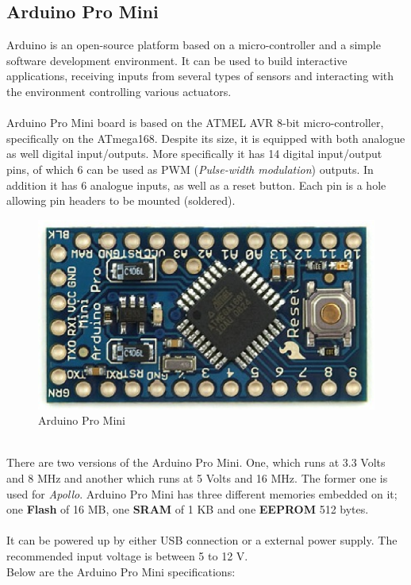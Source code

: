 \documentclass[12pt,a4paper]{report}
\begin{document}
\subsection{Arduino Pro Mini}
Arduino is an open-source platform based on a micro-controller and a simple software development environment. It can be used to build interactive applications, receiving inputs from several types of sensors and interacting with the environment controlling various actuators.\\
\ \\
Arduino Pro Mini board is based on the ATMEL AVR 8-bit micro-controller, specifically on the ATmega168. Despite its size, it is equipped with both analogue as well digital input/outputs. More specifically it has 14 digital input/output pins, of which 6 can be used as PWM (\textit{Pulse-width modulation}) outputs. In addition it has 6 analogue inputs, as well as a reset button. Each pin is a hole allowing pin headers to be mounted (soldered).\ \\
\begin{figure}[H]
\centering
\includegraphics*[scale=0.4]{arduinopromini}
\caption{Arduino Pro Mini} 
\end{figure}
\ \\
There are two versions of the Arduino Pro Mini. One, which runs at 3.3 Volts and 8 MHz and another which runs at 5 Volts and 16 MHz. The former one is used for \emph{Apollo}. Arduino Pro Mini has three different memories embedded on it; one \textbf{Flash} of 16 MB, one \textbf{SRAM} of 1 KB and one \textbf{EEPROM} 512 bytes.\\
\ \\
It can be powered up by either USB connection or a external power supply. The recommended input voltage is between 5 to 12 V.
\ \\
%
Below are the Arduino Pro Mini specifications:
\end{document}
